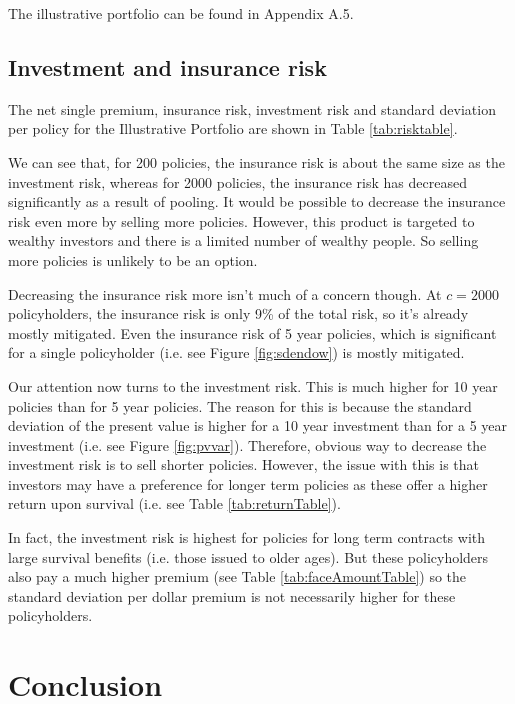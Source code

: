 \documentclass[12pt]{article}
\begin{document}
The illustrative portfolio can be found in Appendix A.5.

\subsection{Investment and insurance risk}

The net single premium, insurance risk, investment risk and standard deviation per policy for the Illustrative Portfolio are shown in Table \ref{tab:risktable}.



We can see that, for 200 policies, the insurance risk is about the same size as the investment risk, whereas for 2000 policies, the insurance risk has decreased significantly as a result of pooling. It would be possible to decrease the insurance risk even more by selling more policies. However, this product is targeted to wealthy investors and there is a limited number of wealthy people. So selling more policies is unlikely to be an option.

Decreasing the insurance risk more isn't much of a concern though. At $c = 2000$ policyholders, the insurance risk is only 9\% of the total risk, so it's already mostly mitigated. Even the insurance risk of 5 year policies, which is significant for a single policyholder (i.e. see Figure \ref{fig:sdendow}) is mostly mitigated.

Our attention now turns to the investment risk. This is much higher for 10 year policies than for 5 year policies. The reason for this is because the standard deviation of the present value is higher for a 10 year investment than for a 5 year investment (i.e. see Figure \ref{fig:pvvar}). Therefore, obvious way to decrease the investment risk is to sell shorter policies. However, the issue with this is that investors may have a preference for longer term policies as these offer a higher return upon survival (i.e. see Table \ref{tab:returnTable}).

In fact, the investment risk is highest for policies for long term contracts with large survival benefits (i.e. those issued to older ages). But these policyholders also pay a much higher premium (see Table \ref{tab:faceAmountTable}) so the standard deviation per dollar premium is not necessarily higher for these policyholders.

\section{Conclusion}
\end{document}
